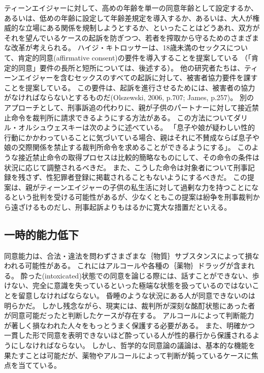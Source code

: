 \documentclass[paper=a4,book,openany]{jlreq}
\newcommand{\ig}[1]{}           %
\begin{document}
ティーンエイジャーに対して、高めの年齢を単一の同意年齢として設定するか、あるいは、低めの年齢に設定して年齢差規定を導入するか、あるいは、大人が権威的な立場にある関係を規制しようとするか、といったことはどうあれ、双方がそれを望んでいるケースの起訴を防ぎつつ、若者を搾取から守るためのさまざまな改革が考えられる。
ハイジ・キトロッサーは、18歳未満のセックスについて、肯定的同意(affirmative consent)の要件を導入することを提案している\citep{kitrosser97:_meanin_consen}
（「肯定的同意」要件の長所と短所については、後述する）。
他の研究者たちは、ティーンエイジャーを含むセックスのすべての起訴に対して、被害者協力要件を課すことを提案している。
この要件は、起訴を進行させるためには、被害者の協力がなければならないとするものだ(Olszewski, 2006, p.707; James, p.257)。
\nocite{olszewski06:_commen_statut_rape_wiscon}\nocite{james09:_romeo_juliet_were_sex_offen}
別のアプローチとして、刑事訴追の代わりに、親が子供のパートナーに対して接近禁止命令を裁判所に請求できるようにする方法がある。
この方法についてダリル・オルシュウェスキー\ig{Olszewski}は次のように述べている。
「息子や娘が疑わしい性的行動にかかわっていることに気づいている場合、親はそれに不賛成ならば息子や娘の交際関係を禁止する裁判所命令を求めることができるようにする」\citep[p.718]{olszewski06:_commen_statut_rape_wiscon}。
このような接近禁止命令の取得プロセスは比較的簡略なものにして、その命令の条件は状況に応じて調整されるべきだ。
また、こうした命令は対象者について刑事記録を残さず、性犯罪者登録に掲載されることもないようにするべきだ。
この提案は、親がティーンエイジャーの子供の私生活に対して過剰な力を持つことになるという批判を受ける可能性があるが、少なくともこの提案は紛争を刑事裁判から遠ざけるものだし、刑事起訴よりもはるかに寛大な措置だといえる。

\subsection{一時的能力低下}

同意能力は、合法・違法を問わずさまざまな｛物質｝{サブスタンス}によって損なわれる可能性がある。
これにはアルコールや各種の｛薬物｝{ドラッグ}が含まれる。
酔った(intoxicated)状態での同意を論じる際には、話すことができない、歩けない、完全に意識を失っているといった極端な状態を扱っているのではないことを留意しなければならない。
昏睡のような状況にある人が同意できないのは明らかだ。
しかし残念ながら、現実には、裁判所が深刻な酩酊状態にあった者が同意可能だったと判断したケースが存在する。
アルコールによって判断能力が著しく損なわれた人々をもっとうまく保護する必要がある。
また、明確かつ一貫した形で同意を表明できないほど酔っている人が性的暴行から保護されるようにしなければならない。
しかし、哲学的な同意論の議論は、基本的な機能を果たすことは可能だが、薬物やアルコールによって判断が鈍っているケースに焦点を当てている。
\end{document}

